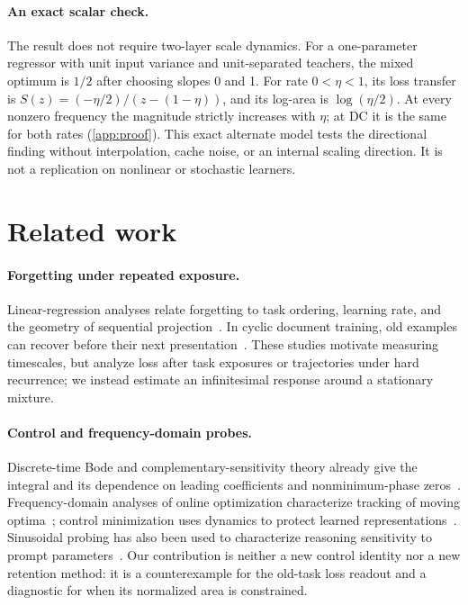 \paragraph{An exact scalar check.}
The result does not require two-layer scale dynamics. For a one-parameter regressor with unit input variance and unit-separated teachers, the mixed optimum is \(1/2\) after choosing slopes 0 and 1. For rate \(0<\eta<1\), its loss transfer is \(S(z)=(-\eta/2)/(z-(1-\eta))\), and its log-area is \(\log(\eta/2)\). At every nonzero frequency the magnitude strictly increases with \(\eta\); at DC it is the same for both rates (\cref{app:proof}). This exact alternate model tests the directional finding without interpolation, cache noise, or an internal scaling direction. It is not a replication on nonlinear or stochastic learners.

\section{Related work}

\paragraph{Forgetting under repeated exposure.}
Linear-regression analyses relate forgetting to task ordering, learning rate, and the geometry of sequential projection~\citep{ding2024,cyclic2023}. In cyclic document training, old examples can recover before their next presentation~\citep{yang2024}. These studies motivate measuring timescales, but analyze loss after task exposures or trajectories under hard recurrence; we instead estimate an infinitesimal response around a stationary mixture.

\paragraph{Control and frequency-domain probes.}
Discrete-time Bode and complementary-sensitivity theory already give the integral and its dependence on leading coefficients and nonminimum-phase zeros~\citep{emami2019,wan2018}. Frequency-domain analyses of online optimization characterize tracking of moving optima~\citep{vanscoy2025}; control minimization uses dynamics to protect learned representations~\citep{dehaan2026}. Sinusoidal probing has also been used to characterize reasoning sensitivity to prompt parameters~\citep{wang2025}. Our contribution is neither a new control identity nor a new retention method: it is a counterexample for the old-task loss readout and a diagnostic for when its normalized area is constrained.

